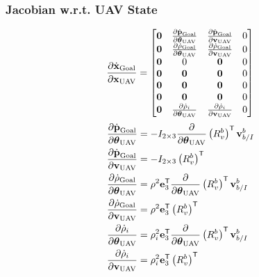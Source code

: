 \subsubsection{Jacobian w.r.t. UAV State}
\begin{equation}
  \frac{\partial \dot{\boldsymbol{\mathrm{x}}}_{\text{Goal}}}{\partial \boldsymbol{\mathrm{x}}_{\text{UAV}}}
  =
  \begin{bmatrix}
    \boldsymbol{\mathrm{0}} & \frac{\partial \dot{\boldsymbol{\mathrm{p}}}_{\text{Goal}}}{\partial
      \boldsymbol{\mathrm{\theta}}_{\text{UAV}}} & \frac{\partial
      \dot{\boldsymbol{\mathrm{p}}}_{\text{Goal}}}{\partial \boldsymbol{\mathrm{v}}_{\text{UAV}}} & 0 \\
    \boldsymbol{\mathrm{0}} & \frac{\partial \dot{\rho}_{\text{Goal}}}{\partial
      \boldsymbol{\mathrm{\theta}}_{\text{UAV}}} & \frac{\partial
      \dot{\rho}_{\text{Goal}}}{\partial \boldsymbol{\mathrm{v}}_{\text{UAV}}} & 0 \\
      \boldsymbol{\mathrm{0}} & 0 & \boldsymbol{\mathrm{0}} & 0 \\
    \boldsymbol{\mathrm{0}} & \boldsymbol{\mathrm{0}} & \boldsymbol{\mathrm{0}} & 0 \\
    \boldsymbol{\mathrm{0}} & \boldsymbol{\mathrm{0}} & \boldsymbol{\mathrm{0}} & 0 \\
    \boldsymbol{\mathrm{0}} & \boldsymbol{\mathrm{0}} & \boldsymbol{\mathrm{0}} & 0 \\
    \boldsymbol{\mathrm{0}} & \frac{\partial \dot{\rho}_{i}}{\partial
      \boldsymbol{\mathrm{\theta}}_{\text{UAV}}} & \frac{\partial
      \dot{\rho}_{i}}{\partial \boldsymbol{\mathrm{v}}_{\text{UAV}}} & 0
  \end{bmatrix}
\end{equation}
\begin{align}
    \frac{\partial \dot{\boldsymbol{\mathrm{p}}}_{\text{Goal}}}{\partial
      \boldsymbol{\mathrm{\theta}}_{\text{UAV}}}
      &=
      - I_{2 \times 3} \frac{\partial}{\partial \boldsymbol{\mathrm{\theta}}_{\text{UAV}}}
      \left(R_{v}^{b}\right)^{\mathsf{T}} \boldsymbol{\mathrm{v}}_{b/I}^{b}
      \\
    \frac{\partial \dot{\boldsymbol{\mathrm{p}}}_{\text{Goal}}}{\partial \boldsymbol{\mathrm{v}}_{\text{UAV}}}
      &=
      - I_{2 \times 3}\left(R_{v}^{b}\right)^{\mathsf{T}}
      \\
    \frac{\partial \dot{\rho}_{\text{Goal}}}{\partial
      \boldsymbol{\mathrm{\theta}}_{\text{UAV}}}
      &=
      \rho^{2} \boldsymbol{\mathrm{e}}_{3}^{\mathsf{T}}
        \frac{\partial}{\partial \boldsymbol{\mathrm{\theta}}_{\text{UAV}}}
        \left(R_{v}^{b}\right)^{\mathsf{T}} \boldsymbol{\mathrm{v}}_{b/I}^{b}
      \\
    \frac{\partial \dot{\rho}_{\text{Goal}}}{\partial \boldsymbol{\mathrm{v}}_{\text{UAV}}}
      &=
      \rho^{2} \boldsymbol{\mathrm{e}}_{3}^{\mathsf{T}} \left(R_{v}^{b}\right)^{\mathsf{T}}
      \\
    \frac{\partial \dot{\rho}_i}{\partial
      \boldsymbol{\mathrm{\theta}}_{\text{UAV}}}
      &=
      \rho_i^{2} \boldsymbol{\mathrm{e}}_{3}^{\mathsf{T}}
        \frac{\partial}{\partial \boldsymbol{\mathrm{\theta}}_{\text{UAV}}}
        \left(R_{v}^{b}\right)^{\mathsf{T}} \boldsymbol{\mathrm{v}}_{b/I}^{b}
      \\
    \frac{\partial \dot{\rho}_i}{\partial \boldsymbol{\mathrm{v}}_{\text{UAV}}}
      &=
      \rho_i^{2} \boldsymbol{\mathrm{e}}_{3}^{\mathsf{T}} \left(R_{v}^{b}\right)^{\mathsf{T}}
      \\
\end{align}

